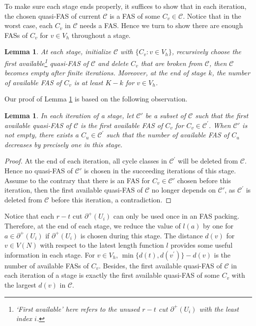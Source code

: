 \documentclass[11pt]{article}
\newtheorem{lemma}[theorem]{Lemma}
\begin{document}
To make sure each stage ends properly, it suffices to show that in each iteration, the chosen quasi-FAS of current $\mathcal{C}$ is a FAS of some $C_v\in\mathcal{C}$. Notice that in the worst case, each $C_v$ in $\mathcal{C}$ needs a FAS. Hence we turn to show there are enough FASs of $C_v$ for $v\in V_h$ throughout a stage.

\begin{lemma} 
\label{lem:3}
At each stage, initialize $\mathcal{C}$ with $\{C_v:v\in V_h\}$, recursively choose the first available\footnote{`First available' here refers to the unused $r-t$ cut $\partial^+(U_i)$ with the least index $i$.} quasi-FAS of $\mathcal{C}$ and delete $C_v$ that are broken from $\mathcal{C}$, then $\mathcal{C}$ becomes empty after finite iterations. Moreover, at the end of stage $k$, the number of available FAS of $C_v$ is at least $K-k$ for $v\in V_h$.
\end{lemma}

Our proof of Lemma \ref{lem:3} is based on the following observation. 

\begin{lemma}
\label{lem:4} 
In each iteration of a stage, let $\mathcal{C}'$ be a subset of $\mathcal{C}$ such that the first available quasi-FAS of $\mathcal{C}$ is the first available FAS of $C_v$ for $C_v \in\mathcal{C}^\prime$. When $\mathcal{C}'$ is not empty,  there exists a $C_u\in \mathcal{C}^\prime$ such that the number of available FAS of $C_u$ decreases by precisely one in this stage.
\end{lemma}

\begin{proof}
At the end of each iteration, all cycle classes in $\mathcal{C}^\prime$ will be deleted from $\mathcal{C}$. Hence no quasi-FAS of $\mathcal{C}'$ is chosen in the succeeding iterations of this stage. Assume to the contrary that there is an FAS for $C_v\in\mathcal{C}'$ chosen before this iteration, then the first available quasi-FAS of $\mathcal{C}$ no longer depends on $\mathcal{C}'$, as $\mathcal{C}^\prime$ is deleted from $\mathcal{C}$ before this iteration, a contradiction.
\end{proof}

Notice that each $r-t$ cut $\partial^+(U_i)$ can only be used once in an FAS packing. Therefore, at the end of each stage, we reduce the value of $l(a)$ by one for $a\in \partial^+(U_i)$ if $\partial^+(U_i)$ is chosen during this stage. The distance $d(v)$ for $v\in V(N)$ with respect to the latest length function $l$ provides some useful information in each stage. For $v\in V_h$, $\min\{d(t),d(v^\prime)\}-d(v)$ is the number of available FASs of $C_v$. Besides, the first available quasi-FAS of $\mathcal{C}$ in each iteration of a stage is exactly the first available quasi-FAS of some $C_v$ with the largest $d(v)$ in $\mathcal{C}$.
\end{document}
